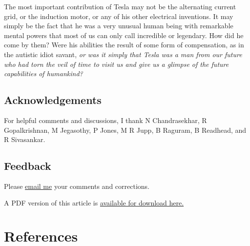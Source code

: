 \documentclass[
  12pt,
  british,
  a4paper,
  rgb,
  dvipsnames,
  svgnames,
  hyphens]{article}
\begin{document}
The most important contribution of Tesla may not be the alternating
current grid, or the induction motor, or any of his other electrical
inventions. It may simply be the fact that he was a very unusual human
being with remarkable mental powers that most of us can only call
incredible or legendary. How did he come by them? Were his abilities the
result of some form of compensation, as in the autistic idiot savant,
\emph{or was it simply that Tesla was a man from our future who had torn
the veil of time to visit us and give us a glimpse of the future
capabilities of humankind?}

\hypertarget{acknowledgements}{%
\subsection{Acknowledgements}\label{acknowledgements}}

For helpful comments and discussions, I thank N Chandrasekhar, R
Gopalkrishnan, M Jegasothy, P Jones, M R Jupp, B Raguram, B Readhead,
and R Sivasankar.

\hypertarget{feedback}{%
\subsection{Feedback}\label{feedback}}

Please \href{mailto:feedback.swanlotus@gmail.com}{email me} your
comments and corrections.

\noindent A PDF version of this article is
\href{./mind-of-tesla.pdf}{available for download here.}

\hypertarget{bibliography}{%
\section*{References}\label{bibliography}}
\end{document}
